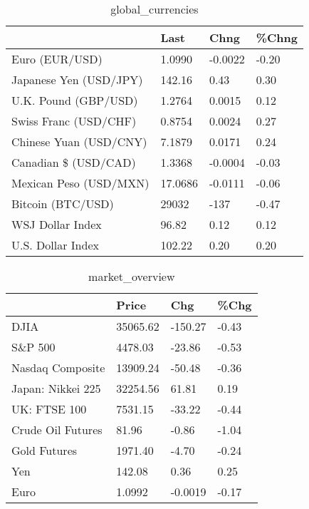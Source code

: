 \documentclass{article}%
\begin{document}
%


\begin{table}[htbp]%
\caption{global\_currencies}%
\centering%
\begin{adjustbox}{width=1\textwidth}%
\begin{tabular}{llll}
\toprule
                       &    Last &    Chng & \%Chng \\
\midrule
        Euro (EUR/USD) &  1.0990 & -0.0022 & -0.20 \\
Japanese Yen (USD/JPY) &  142.16 &    0.43 &  0.30 \\
  U.K. Pound (GBP/USD) &  1.2764 &  0.0015 &  0.12 \\
 Swiss Franc (USD/CHF) &  0.8754 &  0.0024 &  0.27 \\
Chinese Yuan (USD/CNY) &  7.1879 &  0.0171 &  0.24 \\
  Canadian \$ (USD/CAD) &  1.3368 & -0.0004 & -0.03 \\
Mexican Peso (USD/MXN) & 17.0686 & -0.0111 & -0.06 \\
     Bitcoin (BTC/USD) &   29032 &    -137 & -0.47 \\
      WSJ Dollar Index &   96.82 &    0.12 &  0.12 \\
     U.S. Dollar Index &  102.22 &    0.20 &  0.20 \\
\bottomrule
\end{tabular}
%
\end{adjustbox}%
\end{table}

%


\begin{table}[htbp]%
\caption{market\_overview}%
\centering%
\begin{adjustbox}{width=1\textwidth}%
\begin{tabular}{llll}
\toprule
                  &    Price &     Chg &  \%Chg \\
\midrule
             DJIA & 35065.62 & -150.27 & -0.43 \\
          S\&P 500 &  4478.03 &  -23.86 & -0.53 \\
 Nasdaq Composite & 13909.24 &  -50.48 & -0.36 \\
Japan: Nikkei 225 & 32254.56 &   61.81 &  0.19 \\
     UK: FTSE 100 &  7531.15 &  -33.22 & -0.44 \\
Crude Oil Futures &    81.96 &   -0.86 & -1.04 \\
     Gold Futures &  1971.40 &   -4.70 & -0.24 \\
              Yen &   142.08 &    0.36 &  0.25 \\
             Euro &   1.0992 & -0.0019 & -0.17 \\
\bottomrule
\end{tabular}
%
\end{adjustbox}%
\end{table}

%
\end{document}
